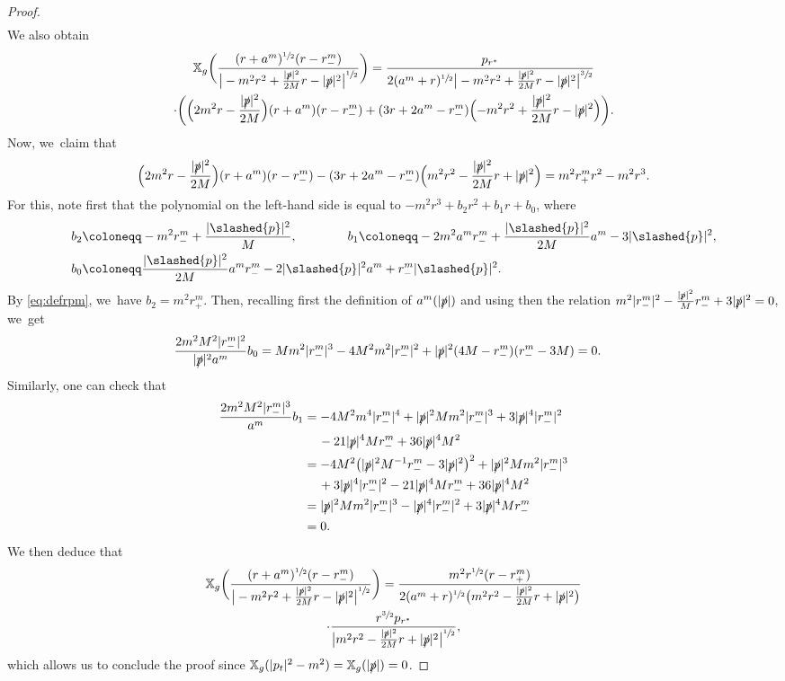 \documentclass[10pt]{amsart}
\theoremstyle{plain}
\theoremstyle{definition}
\newcommand\T{{\mathbb{X}}}
\begin{document}
\begin{proof}
\begin{align*}
\end{align*}
We also obtain
\begin{multline*}
\T_g \biggl(\frac{(r+a^{m})^{\sfrac{1}{2}}(r-r_-^m)}{\big| -m^2 r^2+\frac{|\slashed{p}|^2}{2M}r-|\slashed{p}|^2 \big|^{\sfrac{1}{2}}}\biggr)=\frac{p_{r^*} }{2(a^{m}+r)^{\sfrac{1}{2}}\big|-m^2 r^2+\frac{|\slashed{p}|^2}{2M}r-|\slashed{p}|^2\big|^{\sfrac{3}{2}}} \\
\cdot \biggl(\Bigl(2m^2 r-\frac{|\slashed{p}|^2}{2M}\Bigr)(r+a^{m})(r-r^{m}_-)+(3r+2a^{m}-r^{m}_-)\Bigl(-m^2 r^2+\frac{|\slashed{p}|^2}{2M}r-|\slashed{p}|^2\Bigr)\biggr).
\end{multline*}
Now, we~claim that
\[
\Bigl(2m^2 r-\frac{|\slashed{p}|^2}{2M}\Bigr)(r+a^{m})(r-r^{m}_-)-(3r+2a^{m}-r^{m}_-)\Bigl(m^2 r^2-\frac{|\slashed{p}|^2}{2M}r+|\slashed{p}|^2\Bigr)=m^2r^{m}_+r^2-m^2r^3.
\]
For this, note first that the polynomial on the left-hand side is equal to $-m^2r^3+b_2r^2+b_1r+b_0$, where
\begin{align*}
b_2 & \coloneqq -m^2r_-^m+\frac{|\slashed{p}|^2}{M},\qquad\qquad b_1 \coloneqq -2m^2a^mr_-^m+\frac{|\slashed{p}|^2}{2M}a^m -3 |\slashed{p}|^2, \\
b_0 & \coloneqq \frac{|\slashed{p}|^2}{2M}a^mr_-^m-2|\slashed{p}|^2a^m+r_-^m |\slashed{p}|^2.
\end{align*}
By \eqref{eq:defrpm}, we~have $b_2=m^2r_+^m$. Then, recalling first the definition of $a^{m}(|\slashed{p}|)$ and using then the relation $m^2|r_-^m|^2-\frac{|\slashed{p}|^2}{M}r_-^m+3|\slashed{p}|^2=0$, we~get
\begin{align*}
\frac{2m^2M^2|r_-^m|^2}{|\slashed{p}|^2 a^m} b_0 & = M m^2|r_-^m|^3-4M^2m^2|r_-^m|^2+|\slashed{p}|^2(4M-r_-^m)(r_-^m-3M) =0.
\end{align*}
Similarly, one can check that
\begin{align*}
\frac{2m^2M^2|r_-^m|^3}{a^m} b_1 & =-4M^2m^4|r_-^m|^4+|\slashed{p}|^2M m^2|r_-^m|^3+3|\slashed{p}|^4|r_-^m|^2 \\
& \quad \, -21 |\slashed{p}|^4 M r_-^m+36|\slashed{p}|^4 M^2 \\
& = -4M^2 \bigl(|\slashed{p}|^2 M^{-1}r_-^m-3|\slashed{p}|^2 \bigr)^2+|\slashed{p}|^2M m^2|r_-^m|^3 \\
& \quad \, +3|\slashed{p}|^4|r_-^m|^2-21 |\slashed{p}|^4 M r_-^m+36|\slashed{p}|^4 M^2 \\
& = |\slashed{p}|^2M m^2|r_-^m|^3-|\slashed{p}|^4|r_-^m|^2+3 |\slashed{p}|^4 M r_-^m \\
& =0.
\end{align*}
We then deduce that
\begin{multline*}
\T_g \biggl(\frac{(r+a^{m})^{\sfrac{1}{2}}(r-r_-^m)}{\big| -m^2 r^2+\frac{|\slashed{p}|^2}{2M}r-|\slashed{p}|^2 \big|^{\sfrac{1}{2}}}\biggr) = \frac{m^2 r^{\sfrac{1}{2}}(r-r^{m}_+)}{2(a^m+r)^{\sfrac{1}{2}}\bigl(m^2 r^2-\frac{|\slashed{p}|^2}{2M}r+|\slashed{p}|^2 \bigr)} \\
\cdot \frac{r^{\sfrac{3}{2}}p_{r^*}}{\big|m^2r^2-\frac{|\slashed{p}|^2}{2M}r+|\slashed{p}|^2\big|^{\sfrac{1}{2}}},
\end{multline*}
which allows us to conclude the proof since $\T_g (|p_t|^2-m^2)=\T_g(|\slashed{p}|)=0$.
\end{proof}
\end{document}
